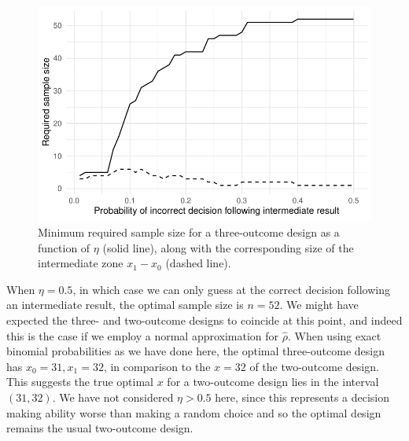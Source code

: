\documentclass[Crown, times, sagev]{sagej}
\begin{document}
\begin{figure}
\centering
\includegraphics[scale=0.8]{./figures/eta_ns}
\caption{Minimum required sample size for a three-outcome design as a function of $\eta$ (solid line), along with the corresponding size of the intermediate zone $x_1 - x_0$ (dashed line).}
\label{fig:eta_ns}
\end{figure}

When $\eta = 0.5$, in which case we can only guess at the correct decision following an intermediate result, the optimal sample size is $n = 52$. We might have expected the three- and two-outcome designs to coincide at this point, and indeed this is the case if we employ a normal approximation for $\hat{\rho}$. When using exact binomial probabilities as we have done here, the optimal three-outcome design has $x_0 = 31, x_1 = 32$, in comparison to the $x = 32$ of the two-outcome design. This suggests the true optimal $x$ for a two-outcome design lies in the interval $(31, 32)$. We have not considered $\eta > 0.5$ here, since this represents a decision making ability worse than making a random choice and so the optimal design remains the usual two-outcome design.
\end{document}
